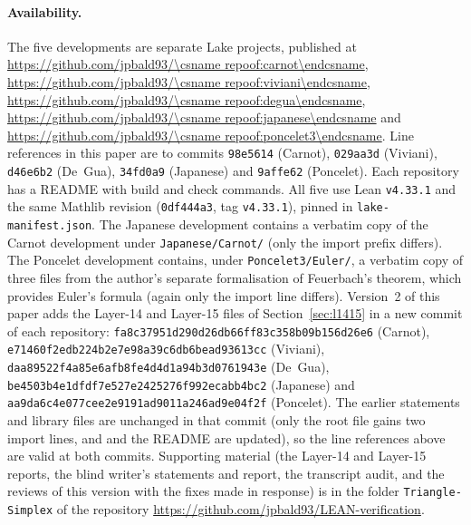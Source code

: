 \documentclass[11pt]{article}
\theoremstyle{definition}
\theoremstyle{remark}
\newcommand{\repo}[1]{https://github.com/jpbald93/\csname repoof:#1\endcsname}
\begin{document}
\paragraph{Availability.}
{\sloppy The five developments are separate Lake projects, published at
\url{\repo{carnot}}, \url{\repo{viviani}}, \url{\repo{degua}}, \url{\repo{japanese}} and
\url{\repo{poncelet3}}. Line references in this paper are to commits \texttt{98e5614} (Carnot),
\texttt{029aa3d} (Viviani), \texttt{d46e6b2} (De~Gua), \texttt{34fd0a9} (Japanese) and
\texttt{9affe62} (Poncelet). Each repository has a README with build and check commands.
All five use Lean \texttt{v4.33.1} and the same Mathlib revision
(\texttt{0df444a3}, tag \texttt{v4.33.1}), pinned in \texttt{lake-manifest.json}.
The Japanese development contains a verbatim copy of the Carnot development under
\texttt{Japanese/Carnot/} (only the import prefix differs). The Poncelet development contains, under
\texttt{Poncelet3/Euler/}, a verbatim copy of three files from the author's separate formalisation
of Feuerbach's theorem, which provides Euler's formula (again only the import line differs).
Version~2 of this paper adds the Layer-14 and Layer-15 files of Section~\ref{sec:l1415} in a new
commit of each repository: \texttt{fa8c37951d290d26db66ff83c358b09b156d26e6} (Carnot), \texttt{e71460f2edb224b2e7e98a39c6db6bead93613cc} (Viviani),
\texttt{daa89522f4a85e6afb8fe4d4d1a94b3d0761943e} (De~Gua), \texttt{be4503b4e1dfdf7e527e2425276f992ecabb4bc2} (Japanese) and \texttt{aa9da6c4e077cee2e9191ad9011a246ad9e04f2f} (Poncelet). The
earlier statements and library files are unchanged in that commit (only the root file gains two
import lines, and  and the README are updated), so the line references above are valid
at both commits. Supporting material (the Layer-14 and Layer-15 reports, the blind writer's statements and report, the transcript audit, and the reviews of this version with the fixes made in response) is in the folder \texttt{Triangle-Simplex} of the repository \url{https://github.com/jpbald93/LEAN-verification}.\par}
\end{document}
